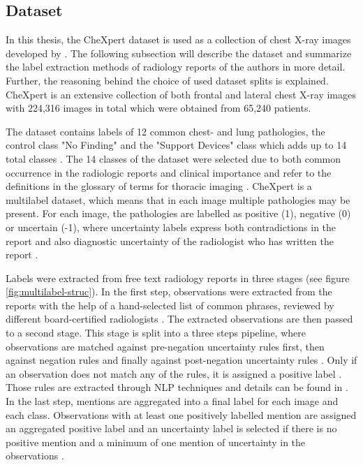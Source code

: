 \subsection{Dataset}
In this thesis, the CheXpert dataset is used as a collection of chest X-ray images developed by \citep{Irvin2019}.
The following subsection will describe the dataset and summarize the label extraction methods of radiology reports of the authors in more detail.
Further, the reasoning behind the choice of used dataset splits is explained. 
CheXpert is an extensive collection of both frontal and lateral chest X-ray images with 224,316 images in total which were obtained from 65,240 patients.
\par
The dataset contains labels of 12 common chest- and lung pathologies, the control class "No Finding" and the "Support Devices" class which adds up to 14 total classes \citep{Irvin2019}.
The 14 classes of the dataset were selected due to both common occurrence in the radiologic reports and clinical importance \citep{Irvin2019} and refer to the definitions in the glossary of terms for thoracic imaging \citep{Hansell2008}.   
CheXpert is a multilabel dataset, which means that in each image multiple pathologies may be present.
For each image, the pathologies are labelled as positive (1), negative (0) or uncertain (-1), where uncertainty labels express both contradictions in the report and also diagnostic uncertainty of the radiologist who has written the report \citep{Irvin2019}.
\par
Labels were extracted from free text radiology reports in three stages (see figure \ref{fig:multilabel-struc}).
In the first step, observations were extracted from the reports with the help of a hand-selected list of common phrases, reviewed by different board-certified radiologists \citep{Irvin2019}.
The extracted observations are then passed to a second stage.
This stage is split into a three steps pipeline, where observations are matched against pre-negation uncertainty rules first, then against negation rules and finally against post-negation uncertainty rules \citep{Irvin2019}.
Only if an observation does not match any of the rules, it is assigned a positive label \citep{Irvin2019}.
Those rules are extracted through NLP techniques and details can be found in \citep{Irvin2019}.
In the last step, mentions are aggregated into a final label for each image and each class.
Observations with at least one positively labelled mention are assigned an aggregated positive label and an uncertainty label is selected if there is no positive mention and a minimum of one mention of uncertainty in the observations \citep{Irvin2019}.
